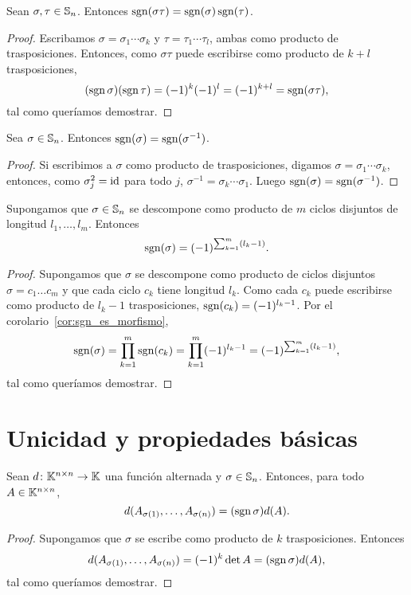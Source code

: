 \begin{cor}
    \label{cor:sgn_es_morfismo}
    Sean $\sigma,\tau\in\mathbb{S}_n$. Entonces
    $\operatorname{sgn}(\sigma\tau)=\operatorname{sgn}(\sigma)\operatorname{sgn}(\tau)$.

    \begin{proof}
		Escribamos $\sigma=\sigma_1\cdots\sigma_k$ y $\tau=\tau_1\cdots\tau_l$,
		ambas como producto de trasposiciones. Entonces, como $\sigma\tau$
		puede escribirse como producto de $k+l$ trasposiciones, 
       	\[
			(\operatorname{sgn}\sigma)(\operatorname{sgn}\tau)
			=(-1)^k(-1)^l
			=(-1)^{k+l}
			=\operatorname{sgn}(\sigma\tau),
        \]
        tal como queríamos demostrar.
    \end{proof}
\end{cor}

\begin{cor}
	Sea $\sigma\in\mathbb{S}_n$. Entonces $\operatorname{sgn}(\sigma)=\operatorname{sgn}(\sigma^{-1})$. 

	\begin{proof}
		Si escribimos a $\sigma$ como producto de trasposiciones, digamos
		$\sigma=\sigma_1\cdots\sigma_k$, entonces, como $\sigma_j^2=\operatorname{id}$ para
		todo $j$, $\sigma^{-1}=\sigma_k\cdots\sigma_1$. Luego
		$\operatorname{sgn}(\sigma)=\operatorname{sgn}(\sigma^{-1})$. 
	\end{proof}
\end{cor}

\begin{cor}
    Supongamos que $\sigma\in\mathbb{S}_n$ se descompone como producto de $m$ ciclos
    disjuntos de longitud $l_1,\dots,l_m$. Entonces
    \[
        \operatorname{sgn}(\sigma)=(-1)^{\sum_{k=1}^m(l_k-1)}.
    \]

    \begin{proof}
        Supongamos que $\sigma$ se descompone como producto de ciclos disjuntos
        $\sigma=c_1\dots c_m$ y que cada ciclo $c_k$ tiene longitud $l_k$. Como
        cada $c_k$  puede escribirse como producto de $l_k-1$ trasposiciones,
        $\operatorname{sgn}(c_k)=(-1)^{l_k-1}$. Por el corolario~\ref{cor:sgn_es_morfismo}, 
        \[
            \operatorname{sgn}(\sigma)=\prod_{k=1}^m\operatorname{sgn}(c_k)=\prod_{k=1}^m(-1)^{l_k-1}=(-1)^{\sum_{k=1}^m(l_k-1)},
        \]
        tal como queríamos demostrar.
    \end{proof}
\end{cor}

\section{Unicidad y propiedades básicas}

\begin{lem}
	\label{lem:sigma}
    Sean $d\colon\mathbb{K}^{n\times n}\to\mathbb{K}$ una función alternada y
    $\sigma\in\mathbb{S}_n$. Entonces, para todo $A\in\mathbb{K}^{n\times n}$, 
   \[
        d(A_{\sigma(1)},\dots,A_{\sigma(n)})=(\operatorname{sgn}\sigma)d(A).
   \]

   \begin{proof}
		Supongamos que $\sigma$ se escribe como producto de $k$ trasposiciones.
		Entonces 
        \[
            d(A_{\sigma(1)},\dots,A_{\sigma(n)})=(-1)^k\det A=(\operatorname{sgn}\sigma)d(A),
        \]
        tal como queríamos demostrar. 
   \end{proof}
\end{lem}


